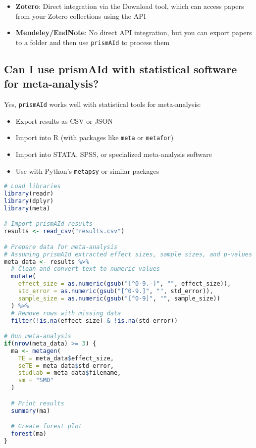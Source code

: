 \begin{itemize}
    \item \textbf{Zotero}: Direct integration via the Download tool, which can access papers from your Zotero collections using the API
    \item \textbf{Mendeley/EndNote}: No direct API integration, but you can export papers to a folder and then use \texttt{prismAId} to process them
\end{itemize}

\subsection{Can I use prismAId with statistical software for meta-analysis?}

Yes, \texttt{prismAId} works well with statistical tools for meta-analysis:

\begin{itemize}
    \item Export results as CSV or JSON
    \item Import into R (with packages like \texttt{meta} or \texttt{metafor})
    \item Import into STATA, SPSS, or specialized meta-analysis software
    \item Use with Python's \texttt{metapsy} or similar packages
\end{itemize}

\begin{commandbox}
\begin{lstlisting}[language=R]
# Load libraries
library(readr)
library(dplyr)
library(meta)

# Import prismAId results
results <- read_csv("results.csv")

# Prepare data for meta-analysis
# Assuming prismAId extracted effect sizes, sample sizes, and p-values
meta_data <- results %>%
  # Clean and convert text to numeric values
  mutate(
    effect_size = as.numeric(gsub("[^0-9.-]", "", effect_size)),
    std_error = as.numeric(gsub("[^0-9.]", "", std_error)),
    sample_size = as.numeric(gsub("[^0-9]", "", sample_size))
  ) %>%
  # Remove rows with missing data
  filter(!is.na(effect_size) & !is.na(std_error))

# Run meta-analysis
if(nrow(meta_data) >= 3) {
  ma <- metagen(
    TE = meta_data$effect_size,
    seTE = meta_data$std_error,
    studlab = meta_data$filename,
    sm = "SMD"
  )

  # Print results
  summary(ma)

  # Create forest plot
  forest(ma)
}
\end{lstlisting}
\end{commandbox}


